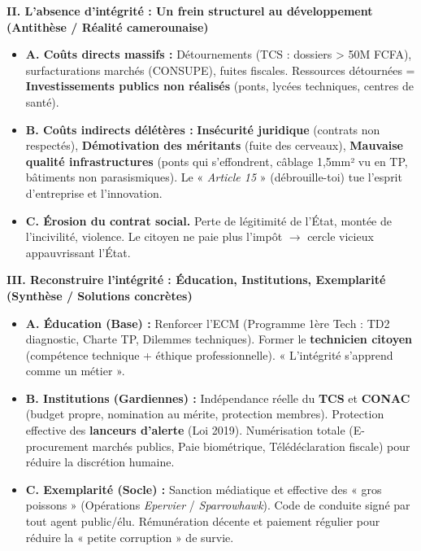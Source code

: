 \documentclass[11pt]{article}
\begin{document}
\begin{exoresolu}
    \textbf{II. L'absence d'intégrité : Un frein structurel au développement (Antithèse / Réalité camerounaise)}
    \begin{itemize}
        \item \textbf{A. Coûts directs massifs :} Détournements (TCS : dossiers > 50M FCFA), surfacturations marchés (CONSUPE), fuites fiscales. Ressources détournées = \textbf{Investissements publics non réalisés} (ponts, lycées techniques, centres de santé).
        \item \textbf{B. Coûts indirects délétères :} \textbf{Insécurité juridique} (contrats non respectés), \textbf{Démotivation des méritants} (fuite des cerveaux), \textbf{Mauvaise qualité infrastructures} (ponts qui s'effondrent, câblage 1,5mm² vu en TP, bâtiments non parasismiques). Le « \emph{Article 15} » (débrouille-toi) tue l'esprit d'entreprise et l'innovation.
        \item \textbf{C. Érosion du contrat social.} Perte de légitimité de l'État, montée de l'incivilité, violence. Le citoyen ne paie plus l'impôt $\rightarrow$ cercle vicieux appauvrissant l'État.
    \end{itemize}

    \textbf{III. Reconstruire l'intégrité : Éducation, Institutions, Exemplarité (Synthèse / Solutions concrètes)}
    \begin{itemize}
        \item \textbf{A. Éducation (Base) :} Renforcer l'ECM (Programme 1ère Tech : TD2 diagnostic, Charte TP, Dilemmes techniques). Former le \textbf{technicien citoyen} (compétence technique + éthique professionnelle). « L'intégrité s'apprend comme un métier ».
        \item \textbf{B. Institutions (Gardiennes) :} Indépendance réelle du \textbf{TCS} et \textbf{CONAC} (budget propre, nomination au mérite, protection membres). Protection effective des \textbf{lanceurs d'alerte} (Loi 2019). Numérisation totale (E-procurement marchés publics, Paie biométrique, Télédéclaration fiscale) pour réduire la discrétion humaine.
        \item \textbf{C. Exemplarité (Socle) :} Sanction médiatique et effective des « gros poissons » (Opérations \emph{Epervier} / \emph{Sparrowhawk}). Code de conduite signé par tout agent public/élu. Rémunération décente et paiement régulier pour réduire la « petite corruption » de survie.
    \end{itemize}


\end{exoresolu}
\end{document}
